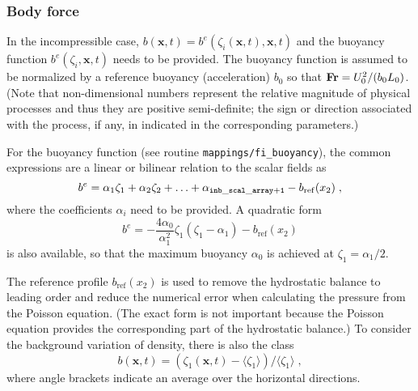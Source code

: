 \subsubsection{Body force}

In the incompressible case, $b(\mathbf{x},t)=b^e(\zeta_i(\mathbf{x},t),\mathbf{x},t)$ and the buoyancy function $b^e(\zeta_i,\mathbf{x},t)$ needs to be provided. The buoyancy function is assumed to be normalized by a reference buoyancy (acceleration) $b_0$ so that $\mathrm{\bf Fr}=U_0^2/(b_0L_0)$. (Note that non-dimensional numbers represent the relative magnitude of physical processes and thus they are positive semi-definite; the sign or direction associated with the process, if any, in indicated in the corresponding parameters.)

For the buoyancy function (see routine {\tt mappings/fi\_buoyancy}), the common expressions are a linear or bilinear relation to the scalar fields as
\begin{equation}
    b^e=\alpha_1\zeta_1+\alpha_2\zeta_2+\ldots+\alpha_\mathrm{\tt inb\_scal\_array+1} -b_\mathrm{ref}(x_2)\;,
\end{equation}
where the coefficients $\alpha_i$ need to be provided. A quadratic form
\begin{equation}
    b^e=-\frac{4\alpha_0}{\alpha_1^2}\zeta_1(\zeta_1-\alpha_1) -b_\mathrm{ref}(x_2)
\end{equation}
is also available, so that the maximum buoyancy $\alpha_0$ is achieved at
$\zeta_1=\alpha_1/2$.

The reference profile $b_\mathrm{ref}(x_2)$ is used to remove the hydrostatic balance to leading order and reduce the numerical error when calculating the pressure from the Poisson equation. (The exact form is not important because the Poisson equation provides the corresponding part of the hydrostatic balance.) To consider the background variation of density, there is also the class
\begin{equation}
    b(\mathbf{x},t)=(\zeta_1(\mathbf{x},t)-\langle \zeta_1\rangle)/\langle \zeta_1\rangle \;,
\end{equation}
where angle brackets indicate an average over the horizontal directions.



